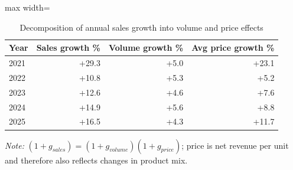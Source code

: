 \begin{table}[htbp]
\centering
\small
\caption{Decomposition of annual sales growth into volume and price effects}
\label{tab:pricevolume}
\begin{adjustbox}{max width=\linewidth}
\begin{tabular}{lrrr}
\toprule
\textbf{Year} & \textbf{Sales growth \%} & \textbf{Volume growth \%} & \textbf{Avg price growth \%} \\
\midrule
2021 & +29.3 & +5.0 & +23.1 \\
2022 & +10.8 & +5.3 & +5.2 \\
2023 & +12.6 & +4.6 & +7.6 \\
2024 & +14.9 & +5.6 & +8.8 \\
2025 & +16.5 & +4.3 & +11.7 \\
\bottomrule
\end{tabular}
\end{adjustbox}
\par\smallskip\parbox{0.92\linewidth}{\footnotesize\emph{Note:} $(1+g_{sales}) = (1+g_{volume})(1+g_{price})$; price is net revenue per unit and therefore also reflects changes in product mix.}
\end{table}